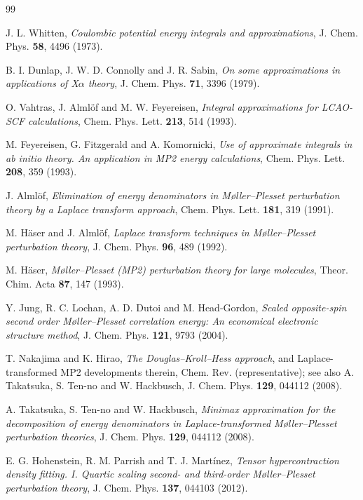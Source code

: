 \documentclass[aip,jcp,amsmath,amssymb,preprint,superscriptaddress]{revtex4-2}%
\begin{document}
\begin{thebibliography}{99}

 J. L. Whitten,
  \emph{Coulombic potential energy integrals and approximations},
  J. Chem. Phys. \textbf{58}, 4496 (1973).

 B. I. Dunlap, J. W. D. Connolly and J. R. Sabin,
  \emph{On some approximations in applications of X$\alpha$ theory},
  J. Chem. Phys. \textbf{71}, 3396 (1979).

 O. Vahtras, J. Alml{\"o}f and M. W. Feyereisen,
  \emph{Integral approximations for LCAO-SCF calculations},
  Chem. Phys. Lett. \textbf{213}, 514 (1993).

 M. Feyereisen, G. Fitzgerald and A. Komornicki,
  \emph{Use of approximate integrals in ab initio theory. An application in
  MP2 energy calculations}, Chem. Phys. Lett. \textbf{208}, 359 (1993).

 J. Alml{\"o}f,
  \emph{Elimination of energy denominators in M{\o}ller--Plesset
  perturbation theory by a Laplace transform approach},
  Chem. Phys. Lett. \textbf{181}, 319 (1991).

 M. H{\"a}ser and J. Alml{\"o}f,
  \emph{Laplace transform techniques in M{\o}ller--Plesset perturbation
  theory}, J. Chem. Phys. \textbf{96}, 489 (1992).

 M. H{\"a}ser,
  \emph{M{\o}ller--Plesset (MP2) perturbation theory for large molecules},
  Theor. Chim. Acta \textbf{87}, 147 (1993).

 Y. Jung, R. C. Lochan, A. D. Dutoi and M. Head-Gordon,
  \emph{Scaled opposite-spin second order M{\o}ller--Plesset correlation
  energy: An economical electronic structure method},
  J. Chem. Phys. \textbf{121}, 9793 (2004).

 T. Nakajima and K. Hirao,
  \emph{The Douglas--Kroll--Hess approach}, and Laplace-transformed MP2
  developments therein, Chem. Rev. (representative);
  see also A. Takatsuka, S. Ten-no and W. Hackbusch,
  J. Chem. Phys. \textbf{129}, 044112 (2008).

 A. Takatsuka, S. Ten-no and W. Hackbusch,
  \emph{Minimax approximation for the decomposition of energy denominators
  in Laplace-transformed M{\o}ller--Plesset perturbation theories},
  J. Chem. Phys. \textbf{129}, 044112 (2008).

 E. G. Hohenstein, R. M. Parrish and T. J. Mart{\'i}nez,
  \emph{Tensor hypercontraction density fitting. I. Quartic scaling second-
  and third-order M{\o}ller--Plesset perturbation theory},
  J. Chem. Phys. \textbf{137}, 044103 (2012).


\end{thebibliography}
\end{document}
